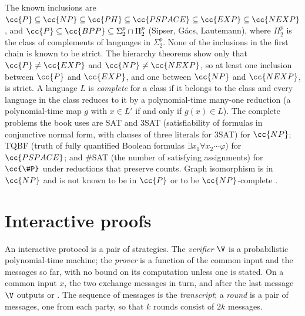 \begin{refsection}
The known inclusions are $\cc{P}\subseteq\cc{NP}\subseteq\cc{PH}\subseteq\cc{PSPACE}\subseteq\cc{EXP}\subseteq\cc{NEXP}$, and $\cc{P}\subseteq\cc{BPP}\subseteq\Sigma_2^p\cap\Pi_2^p$ (Sipser, Gács, Lautemann), where $\Pi_2^p$ is the class of complements of languages in $\Sigma_2^p$. None of the inclusions in the first chain is known to be strict. The hierarchy theorems show only that $\cc{P}\neq\cc{EXP}$ and $\cc{NP}\neq\cc{NEXP}$, so at least one inclusion between $\cc{P}$ and $\cc{EXP}$, and one between $\cc{NP}$ and $\cc{NEXP}$, is strict. A language $L$ is \emph{complete} for a class if it belongs to the class and every language in the class reduces to it by a polynomial-time many-one reduction (a polynomial-time map $g$ with $x\in L'$ if and only if $g(x)\in L$). The complete problems the book uses are SAT and 3SAT (satisfiability of formulas in conjunctive normal form, with clauses of three literals for 3SAT) for $\cc{NP}$; TQBF (truth of fully quantified Boolean formulas $\exists x_1\forall x_2\cdots\varphi$) for $\cc{PSPACE}$; and \#SAT (the number of satisfying assignments) for $\cc{\#P}$ under reductions that preserve counts. Graph isomorphism is in $\cc{NP}$ and is not known to be in $\cc{P}$ or to be $\cc{NP}$-complete \parencite{Babai2016}.

\section{Interactive proofs}\label{sec:toolkit:ip}

An interactive protocol is a pair of strategies. The \emph{verifier} $\V$ is a probabilistic polynomial-time machine; the \emph{prover} is a function of the common input and the messages so far, with no bound on its computation unless one is stated. On a common input $x$, the two exchange messages in turn, and after the last message $\V$ outputs \acc{} or \rej. The sequence of messages is the \emph{transcript}; a \emph{round} is a pair of messages, one from each party, so that $k$ rounds consist of $2k$ messages.


\end{refsection}
